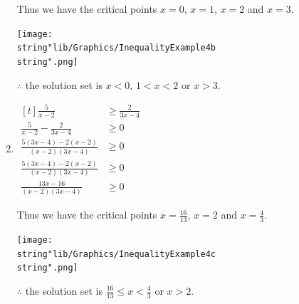 \documentclass[11pt,a4paper]{book}
\begin{document}
\begin{example}{}
\begin{enumerate}[label=(\alph*)]
Thus we have the critical points ${\displaystyle x=0}$, $x=1$, $x=2$
and $x=3$.
\begin{center}
\texttt{[image: \\string"lib/Graphics/InequalityExample4b\\string".png]}
\par\end{center}

$\therefore$ the solution set is $x<0$, $1<x<2$ or $x>3$.

\item
$
\begin{aligned}[t]
{\displaystyle \frac{5}{x-2}} & \geq\frac{2}{3x-4}\\
{\displaystyle \frac{5}{x-2}}-\frac{2}{3x-4} & \geq0\\
\frac{5\left(3x-4\right)-2\left(x-2\right)}{\left(x-2\right)\left(3x-4\right)} & \geq0\\
\frac{5\left(3x-4\right)-2\left(x-2\right)}{\left(x-2\right)\left(3x-4\right)} & \geq0\\
\frac{13x-16}{\left(x-2\right)\left(3x-4\right)} & \geq0
\end{aligned}
$

Thus we have the critical points ${\displaystyle x=\frac{16}{13}}$,
$x=2$ and ${\displaystyle x=\frac{4}{3}}$.
\begin{center}
\texttt{[image: \\string"lib/Graphics/InequalityExample4c\\string".png]}
\par\end{center}

$\therefore$ the solution set is ${\displaystyle \frac{16}{13}\leq x<\frac{4}{3}}$
or $x>2$.
\end{enumerate}
\end{example}
\end{document}
